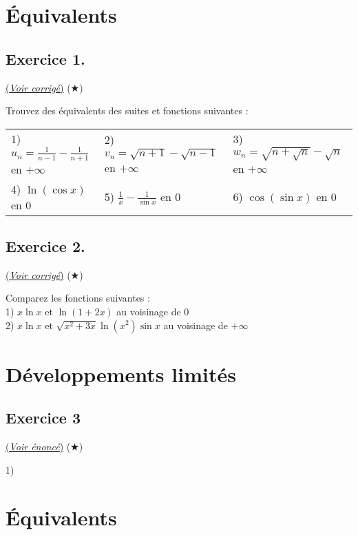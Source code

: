 \documentclass{article}
\newcommand{\0}{\emptyset}
\begin{document}
\section*{Équivalents}
\subsection*{Exercice 1.}
\hyperref[subsec:corr1]{(\textit{Voir corrigé})} ($\bigstar$)
\label{subsec:ex1}
\begin{flushleft}
Trouvez des équivalents des suites et fonctions suivantes :

\begin{tabular}{l l l}
     1) $u_n = \frac{1}{n-1} - \frac{1}{n+1}$ en $+\infty$ & 2) $v_n = \sqrt{n+1} - \sqrt{n-1}$ en $+\infty$ & 3) $w_n =\sqrt{n + \sqrt{n}} - \sqrt{n}$ en $+\infty$\\
     4) $\ln(\cos x)$ en $0$ & 5) $\frac{1}{x} - \frac{1}{\sin x}$ en $0$ & 6) $\cos(\sin x)$ en $0$ \\
\end{tabular}

\end{flushleft}
\subsection*{Exercice 2.}
\hyperref[subsec:corr2]{(\textit{Voir corrigé})} ($\bigstar$)
\label{subsec:ex2}
\begin{flushleft}
Comparez les fonctions suivantes :\\
1) $x \ln x$ et $\ln(1+2x)$ au voisinage de 0\\
2) $x \ln x$ et $\sqrt{x^2 + 3x} \ln(x^2) \sin x$ au voisinage de $+\infty$\\
\end{flushleft}


\section*{Développements limités}
\subsection*{Exercice 3}
\hyperref[subsec:corr3]{(\textit{Voir énoncé})} ($\bigstar$)
\label{subsec:ex3}
\begin{flushleft}
1)
\end{flushleft}


\newpage

\section*{Équivalents}
\end{document}
